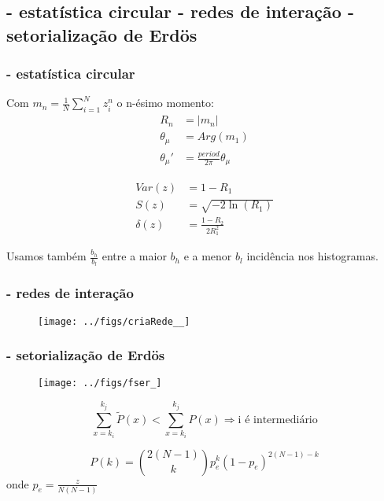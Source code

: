 \documentclass[10pt]{beamer}
\begin{document}
\begin{frame}
\subsection{- estatística circular \;\; - redes de interação \;\; - setorialização de Erdös}
\frametitle{- estatística circular}
Com $m_n=\frac{1}{N}\sum_{i=1}^N z_i^n$ o n-ésimo momento:
\begin{align}\label{eq:cmom}
    R_n&=|m_n| \nonumber \\
    \theta_\mu&=Arg(m_1) \\
    \theta_\mu'&=\frac{period}{2\pi} \theta_\mu \nonumber
\end{align}

\begin{align}
    Var(z)&=1 - R_1 \nonumber\\
    S(z)&= \sqrt{-2\ln(R_1)}\\
    \delta(z)&=\frac{1-R_2}{2 R_1^2} \nonumber
\end{align}

Usamos também $\frac{b_h}{b_l}$ entre a maior $b_h $ e a menor $b_l$ incidência nos histogramas.

\end{frame}
\begin{frame}
\frametitle{- redes de interação}
\begin{figure}[!h]
    \centering
    \texttt{[image: ../figs/criaRede\_\_]}
\end{figure}
\end{frame}
\begin{frame}
\frametitle{- setorialização de Erdös}

\begin{figure}[!h]
    \centering
    \texttt{[image: ../figs/fser\_]}
        \label{fig:setores}
\end{figure}

\begin{equation}\label{criterio2}
    \sum_{x=k_i}^{k_j} \widetilde{P}(x) < \sum_{x=k_i}^{k_j} P(x) \Rightarrow \text{i é intermediário}
\end{equation}

\begin{equation}
    P(k)=\binom{2(N-1)}{k}p_e^k(1-p_e)^{2(N-1)-k}
\end{equation}
onde 
\centering
$p_e=\frac{z}{N(N-1)}$


\end{frame}
\end{document}
